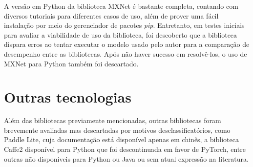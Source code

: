 A versão em Python da biblioteca MXNet é bastante completa, contando com diversos tutoriais para diferentes casos de uso, além de prover uma fácil instalação por meio do gerenciador de pacotes \textit{pip}. Entretanto, em testes iniciais para avaliar a viabilidade de uso da biblioteca, foi descoberto que a biblioteca dispara erros ao tentar executar o modelo usado pelo autor para a comparação de desempenho entre as bibliotecas. Após não haver sucesso em resolvê-los, o uso de MXNet para Python também foi descartado.

\section{Outras tecnologias}

Além das bibliotecas previamente mencionadas, outras bibliotecas foram brevemente avaliadas mas descartadas por motivos desclassificatórios, como Paddle Lite, cuja documentação está disponível apenas em chinês, a biblioteca Caffe2 disponível para Python que foi descontinuada em favor de PyTorch, entre outras não disponíveis para Python ou Java ou sem atual expressão na literatura.